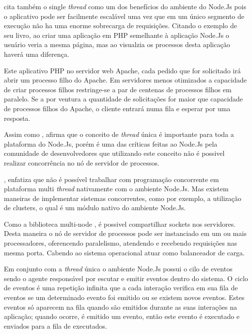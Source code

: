   \cite{Powers:2012} cita também o single \textit{thread} como um dos benefícios do ambiente do Node.Js 
  pois o aplicativo pode ser facilmente escalável uma vez que em um único segmento de execução não ha uma enorme 
  sobrecarga de requisições. Citando o exemplo de seu livro, ao criar uma aplicação em \ac{PHP} semelhante 
  à aplicação Node.Js o usuário veria a mesma página, mas ao visualzia os processos desta aplicação haverá uma 
  diferença.
  
  Este aplicativo \ac{PHP} no servidor web Apache, cada pedido que for solicitado irá abrir um 
  processo filho do Apache. Em servidores menos otimizados a capacidade de criar processos filhos
  restringe-se a par de centenas de processos filhos em paralelo. Se a por ventura a quantidade de solicitações
  for maior que capacidade de processos filhos do Apache, o cliente entrará numa fila e esperar por uma resposta.\cite{Powers:2012}

  Assim como ,  afirma que o conceito de \textit{thread} única é importante para 
  toda a plataforma do Node.Js, porém é uma das críticas feitas ao Node.Js pela comunidade de desenvolvedores 
  que utilizando este conceito não é possivel realizar concorrência no nó de servidor de processos.
  
  , enfatiza que não é possível trabalhar com programação 
  concorrente em plataforma multi \textit{thread} nativamente com o ambiente Node.Js. Mas existem maneiras de implementar sistemas concorrentes, 
  como por exemplo, a utilização de clusters, o qual é um módulo nativo do ambiente Node.Js.
  
  Como a biblioteca  multi-node , é possivel compartilhar sockets nos servidores.
  Desta maneira o nó de servidor de processos pode ser instanciado em um ou mais processadores, oferencendo paralelismo, 
  atendendo e recebendo requisições nas mesma porta. Cabendo ao sistema operacional atuar como balanceador de carga.\cite{Oliveira:2012}
  
  Em conjunto com a \textit{thread} única o ambiente Node.Js possui o cilo de eventos sendo o agente responsável por escutar e 
  emitir eventos dentro do sistema. O ciclo de eventos é uma repetição infinita que a cada interação verifica em sua 
  fila de eventos se um determinado evento foi emitido ou se existem novos eventos. Estes eventos só aparecem na 
  fila quando são emitidos durante as suas interações na aplicação; quando ocorre, é emitido um evento, então este evento 
  é executado e enviados para a fila de executados.\cite{Pereira:2013}
  
